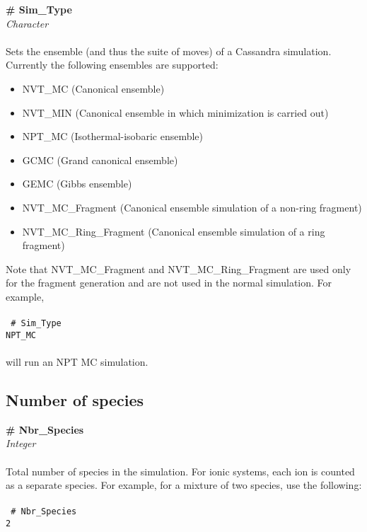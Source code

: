 {\bf \# Sim\_Type} \\
{\it Character} \\ \\
%
Sets the ensemble (and thus the suite of moves) of a Cassandra simulation. Currently the following ensembles are supported: \\
\begin{itemize}
\item NVT\_MC (Canonical ensemble)
\item NVT\_MIN (Canonical ensemble in which minimization is carried out)
\item NPT\_MC (Isothermal-isobaric ensemble)
\item GCMC    (Grand canonical ensemble)
\item GEMC (Gibbs ensemble)
\item NVT\_MC\_Fragment (Canonical ensemble simulation of a non-ring fragment)
\item NVT\_MC\_Ring\_Fragment (Canonical ensemble simulation of a ring fragment)
\end{itemize} 
Note that NVT\_MC\_Fragment and  NVT\_MC\_Ring\_Fragment are used only
for the fragment generation and are not used in the normal
simulation. For example, \\ \\
\texttt{
\# Sim\_Type \\
NPT\_MC \\ \\
}
%
will run an NPT MC simulation.
%
%
%
\subsection{Number of species}\label{sec:Nbr_Species} 
{\bf \# Nbr\_Species} \\
{\it Integer} \\ \\
%
Total number of species in the simulation. For ionic systems, each ion
is counted as a separate species. For example, for a mixture of two
species, use the following: \\  \\
%
\texttt{
\# Nbr\_Species \\
2 
}
%
%
%
